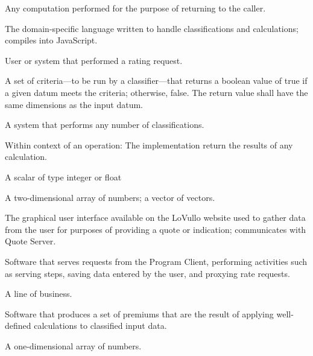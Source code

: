 %


\begin{description}
  Any computation performed for the purpose of returning to the caller.

  The domain-specific language written to handle classifications and
  calculations; compiles into JavaScript.

  User or system that performed a rating request.

  A set of criteria---to be run by a classifier---that returns a boolean value
  of true if a given datum meets the criteria; otherwise, false. The return
  value shall have the same dimensions as the input datum.

  A system that performs any number of classifications.

  Within context of an operation: The implementation \shallnot return the
  results of any calculation.

  A scalar of type integer or float

  A two-dimensional array of numbers; a vector of vectors.

  The graphical user interface available on the LoVullo website used to gather
  data from the user for purposes of providing a quote or indication;
  communicates with Quote Server.

  Software that serves requests from the Program Client, performing activities
  such as serving steps, saving data entered by the user, and proxying rate
  requests.

  A line of business.

  Software that produces a set of premiums that are the result of applying
  well-defined calculations to classified input data.

  A one-dimensional array of numbers.
\end{description}

\enddeptgroup
